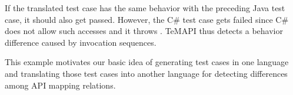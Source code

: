 If the translated test case has the same behavior with the preceding Java test case, it should also get passed. However, the C\# test case gets failed since C\# does not allow such accesses and it throws . TeMAPI thus detects a behavior difference caused by invocation sequences.

This example motivates our basic idea of generating test cases in one language and translating those test cases into another language for detecting differences among API mapping relations. %


